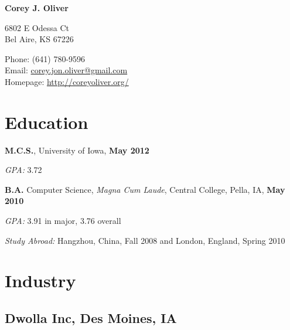 \documentclass[10pt,letterpaper]{article}
\def\name{Corey J. Oliver}
\renewenvironment{itemize}{
  \begin{list}{}{
      \setlength{\leftmargin}{1.5em}
      \setlength{\itemsep}{0.25em}
      \setlength{\parskip}{0pt}
      \setlength{\parsep}{0.25em}
    }
  }{
  \end{list}
}
\newcommand{\yearrange}[1]{\hfill \textbf{#1} \par}
\begin{document}

\centerline{\huge \bf \name}

\bigskip

\noindent
\begin{minipage}[t]{0.49\textwidth}
  6802 E Odessa Ct\\
  Bel Aire, KS 67226
\end{minipage}
\begin{minipage}[t]{0.5\textwidth}
  \hfill Phone: (641) 780-9596 \\ %
  \hspace*{0pt} \hfill Email: \href{mailto:corey.jon.oliver@gmail.com}{corey.jon.oliver@gmail.com} \\
  \hspace*{0pt} \hfill Homepage: \href{http://coreyoliver.org/}{http://coreyoliver.org/}
\end{minipage}

\section*{Education}

\begin{itemize}
\item \textbf{M.C.S.}, University of Iowa, \yearrange{May 2012}
  \begin{itemize}
  \item \textit{GPA:}
    3.72
  \end{itemize}
\item \textbf{B.A.} Computer Science, \textit{Magna Cum Laude}, Central
  College, Pella, IA, \yearrange{May 2010}
  \begin{itemize}
  \item \textit{GPA:}
    3.91 in major, 3.76 overall
  \item \textit{Study Abroad:} Hangzhou, China, Fall 2008 and
    London, England, Spring 2010
  \end{itemize}
\end{itemize}

\section*{Industry}

\subsection*{Dwolla Inc, Des Moines, IA}
\end{document}
